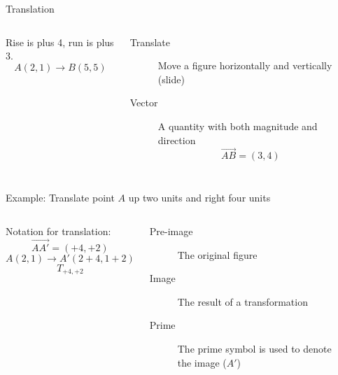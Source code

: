 \begin{frame}{Translation}
    \begin{columns}
      Rise is plus 4, run is plus 3. \\
      $$A(2,1) \rightarrow B(5,5)$$
      \begin{description}
        \item[Translate] Move a figure horizontally and vertically (slide)
        \item[Vector] A quantity with both magnitude and direction 
        $$\overrightarrow{AB}=(3,4)$$
      \end{description}
      \begin{flushright}
      \end{flushright}
    \end{columns}
  \end{frame}

\begin{frame}{Example: Translate point $A$ up two units and right four units}
    \begin{columns}
        Notation for translation: \\
        $$\overrightarrow{AA'}=(+4,+2)$$
        $$A(2,1) \rightarrow A'(2+4,1+2)$$
        $$T_{+4,+2}$$
        \begin{description}
            \item[Pre-image] The original figure
            \item[Image] The result of a transformation
            \item[Prime] The prime symbol is used to denote the image ($A'$)
          \end{description}
    \begin{flushright}
    \end{flushright}
\end{columns}
\end{frame}

